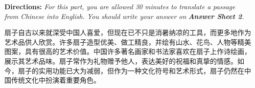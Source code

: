 \documentclass[UTF8,11pt]{ctexart}
\begin{document}
\textbf{Directions: }\textit{For this part, you are allowed 30 minutes to translate a passage from Chinese into English. You should} \textit{write your answer on }\textbf{\textit{Answer Sheet 2}}\textit{.}


扇子自古以来就深受中国人喜爱，但现在已不只是消暑纳凉的工具，而更多地作为艺术品供人欣赏。许多扇子造型优美、做工精良，并绘有山水、花鸟、人物等精美图案，具有很高的艺术价值。中国许多著名画家和书法家喜欢在扇子上作诗绘画，展示其艺术品味。扇子常作为礼物赠予他人，表达美好的祝福和真挚的情感。如今，扇子的实用功能已大为减弱，但作为一种文化符号和艺术形式，扇子仍然在中国传统文化中扮演着重要角色。
\end{document}
